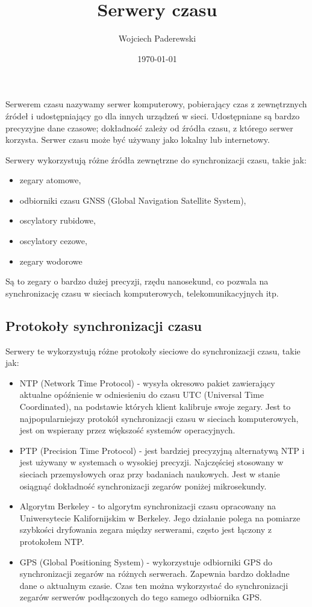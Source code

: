 \documentclass[../main.tex]{subfiles}
\author{Wojciech Paderewski}
\date{\today}
\title{Serwery czasu}
\begin{document}
Serwerem czasu nazywamy serwer komputerowy, pobierający czas z zewnętrznych źródeł i udostępniający go dla innych urządzeń w sieci.
Udostępniane są bardzo precyzyjne dane czasowe; dokładność zależy od źródła czasu, z którego serwer korzysta. Serwer czasu może być używany jako lokalny lub internetowy.

Serwery wykorzystują różne źródła zewnętrzne do synchronizacji czasu, takie jak:
\begin{itemize}
  \item zegary atomowe,
  \item odbiorniki czasu GNSS (Global Navigation Satellite System),
  \item oscylatory rubidowe,
  \item oscylatory cezowe,
  \item zegary wodorowe
\end{itemize}

Są to zegary o bardzo dużej precyzji, rzędu nanosekund, co pozwala na synchronizację czasu w sieciach komputerowych, telekomunikacyjnych itp.

\subsection{Protokoły synchronizacji czasu}
Serwery te wykorzystują różne protokoły sieciowe do synchronizacji czasu, takie jak:
\begin{itemize}
  \item NTP (Network Time Protocol) - 
  wysyła okresowo pakiet zawierający aktualne opóźnienie w odniesieniu do czasu UTC (Universal Time Coordinated), na podstawie których klient kalibruje swoje zegary.
  Jest to najpopularniejszy protokół synchronizacji czasu w sieciach komputerowych, jest on wspierany przez większość systemów operacyjnych.
  \item PTP (Precision Time Protocol) - 
  jest bardziej precyzyjną alternatywą NTP i jest używany w systemach o wysokiej precyzji. Najczęściej stosowany w sieciach przemysłowych oraz przy badaniach naukowych. 
  Jest w stanie osiągnąć dokładność synchronizacji zegarów poniżej mikrosekundy.
  \item Algorytm Berkeley - to algorytm synchronizacji czasu opracowany na Uniwersytecie Kalifornijskim w Berkeley. 
  Jego działanie polega na pomiarze szybkości dryfowania zegara między serwerami, często jest łączony z protokołem NTP.
  \item GPS (Global Positioning System) -  wykorzystuje odbiorniki GPS do synchronizacji zegarów na różnych serwerach.
   Zapewnia bardzo dokładne dane o aktualnym czasie. Czas ten można wykorzystać do synchronizacji
  zegarów serwerów podłączonych do tego samego odbiornika GPS. 
\end{itemize}
\end{document}
